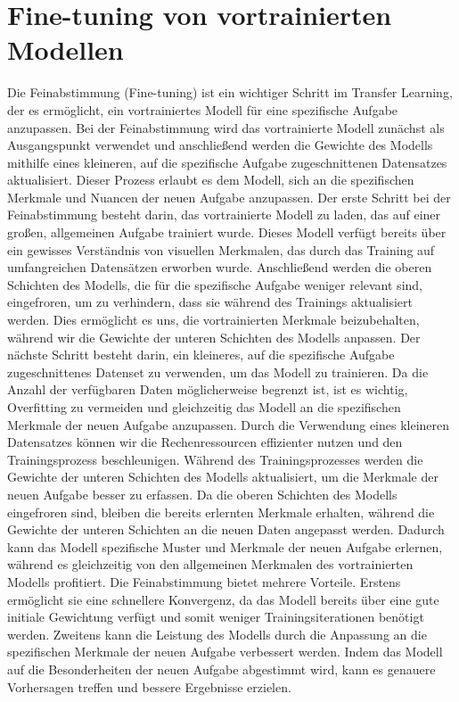 \section{Fine-tuning von vortrainierten Modellen}

    Die Feinabstimmung (Fine-tuning) ist ein wichtiger Schritt im Transfer Learning, der es ermöglicht, ein vortrainiertes Modell für eine spezifische Aufgabe anzupassen. 
    Bei der Feinabstimmung wird das vortrainierte Modell zunächst als Ausgangspunkt verwendet und anschließend werden die Gewichte des Modells mithilfe eines kleineren, auf die spezifische Aufgabe zugeschnittenen Datensatzes aktualisiert. 
    Dieser Prozess erlaubt es dem Modell, sich an die spezifischen Merkmale und Nuancen der neuen Aufgabe anzupassen.
    Der erste Schritt bei der Feinabstimmung besteht darin, das vortrainierte Modell zu laden, das auf einer großen, allgemeinen Aufgabe trainiert wurde. Dieses Modell verfügt bereits über ein gewisses Verständnis von visuellen Merkmalen, das durch das Training auf umfangreichen Datensätzen erworben wurde. 
    Anschließend werden die oberen Schichten des Modells, die für die spezifische Aufgabe weniger relevant sind, eingefroren, um zu verhindern, dass sie während des Trainings aktualisiert werden. 
    Dies ermöglicht es uns, die vortrainierten Merkmale beizubehalten, während wir die Gewichte der unteren Schichten des Modells anpassen.
    Der nächste Schritt besteht darin, ein kleineres, auf die spezifische Aufgabe zugeschnittenes Datenset zu verwenden, um das Modell zu trainieren. 
    Da die Anzahl der verfügbaren Daten möglicherweise begrenzt ist, ist es wichtig, Overfitting zu vermeiden und gleichzeitig das Modell an die spezifischen Merkmale der neuen Aufgabe anzupassen. 
    Durch die Verwendung eines kleineren Datensatzes können wir die Rechenressourcen effizienter nutzen und den Trainingsprozess beschleunigen.
    Während des Trainingsprozesses werden die Gewichte der unteren Schichten des Modells aktualisiert, um die Merkmale der neuen Aufgabe besser zu erfassen. 
    Da die oberen Schichten des Modells eingefroren sind, bleiben die bereits erlernten Merkmale erhalten, während die Gewichte der unteren Schichten an die neuen Daten angepasst werden. 
    Dadurch kann das Modell spezifische Muster und Merkmale der neuen Aufgabe erlernen, während es gleichzeitig von den allgemeinen Merkmalen des vortrainierten Modells profitiert.
    Die Feinabstimmung bietet mehrere Vorteile. 
    Erstens ermöglicht sie eine schnellere Konvergenz, da das Modell bereits über eine gute initiale Gewichtung verfügt und somit weniger Trainingsiterationen benötigt werden. 
    Zweitens kann die Leistung des Modells durch die Anpassung an die spezifischen Merkmale der neuen Aufgabe verbessert werden.
    Indem das Modell auf die Besonderheiten der neuen Aufgabe abgestimmt wird, kann es genauere Vorhersagen treffen und bessere Ergebnisse erzielen.

